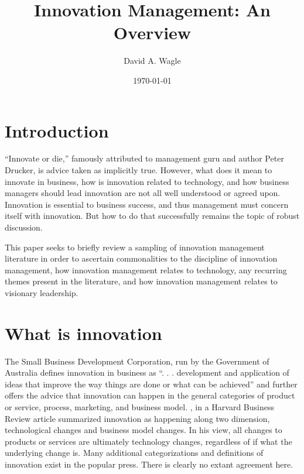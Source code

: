 \documentclass[man]{apa7}
\affiliation{North Central University}
\author{David A. Wagle}
\date{\today}
\title{Innovation Management: An Overview}
\begin{document}
\maketitle


\section{Introduction}
\label{sec:org6168dc9}

``Innovate or die,'' famously attributed to management guru and author Peter Drucker, is advice taken as implicitly true. However, what does it mean to innovate in business, how is innovation related to technology, and how business managers should lead innovation are not all well understood or agreed upon. Innovation is essential to business success, and thus management must concern itself with innovation. But how to do that successfully remains the topic of robust discussion.

This paper seeks to briefly review a sampling of innovation management literature in order to ascertain commonalities to the discipline of innovation management, how innovation management relates to technology, any recurring themes present in the literature, and how innovation management relates to visionary leadership. 

\section{What is innovation}
\label{sec:org933dd1d}

The Small Business Development Corporation, run by the Government of Australia \parencite*{sbdcInnovationSmallBusiness2020} defines innovation in business as ``. . . development and application of ideas that improve the way things are done or what can be achieved'' and further offers the advice that innovation can happen in the general categories of product or service, process, marketing, and business model. \textcite{pisanoYouNeedInnovation2015}, in a Harvard Business Review article summarized innovation as happening along two dimension, technological changes and business model changes. In his view, all changes to products or services are ultimately technology changes, regardless of if what the underlying change is. Many additional categorizations and definitions of innovation exist in the popular press. There is clearly no extant agreement here.
\end{document}
